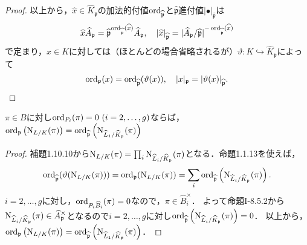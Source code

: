 \begin{proof}
  以上から，$\widehat{x}\in\widehat{K}_\mathfrak{p}$の加法的付値$\operatorname{ord}_{\widehat{\mathfrak{p}}}$と$\widehat{\mathfrak{p}}$進付値$\lvert\bullet\rvert _{\widehat{\mathfrak{p}}}$は
  \[\widehat{x}\widehat{A}_\mathfrak{p}=\widehat{\mathfrak{p}}^{\operatorname{ord}_{\widehat{\mathfrak{p}}}(\widehat{x})}\widehat{A}_\mathfrak{p},\quad\lvert\widehat{x}\rvert _{\widehat{\mathfrak{p}}}=\lvert\widehat{A}_\mathfrak{p}/\widehat{\mathfrak{p}}\rvert^{-\operatorname{ord}_{\widehat{\mathfrak{p}}}(\widehat{x})}\]
  で定まり，$x\in K$に対しては（ほとんどの場合省略されるが）$\vartheta\colon K\hookrightarrow\widehat{K}_\mathfrak{p}$によって
  \[\operatorname{ord}_\mathfrak{p}(x)=\operatorname{ord}_{\widehat{\mathfrak{p}}}(\vartheta(x)),\quad \lvert x\rvert _\mathfrak{p}=\lvert\vartheta(x)\rvert _{\widehat{\mathfrak{p}}}.\]
\end{proof}

\begin{screen}
    $\pi\in B$に対し$\ord_{P_i}(\pi)=0\ (i=2,\ldots,g)$ならば，$\operatorname{ord}_\mathfrak{p}\left(\operatorname{N}_{L/K}(\pi)\right)=\operatorname{ord}_{\widehat{\mathfrak{p}}}\left(\operatorname{N}_{\widehat{L}_1/\widehat{K}_\mathfrak{p}}(\pi)\right)$
\end{screen}
\begin{proof}
  補題1.10.10から$\operatorname{N}_{L/K}(\pi)=\prod_i\operatorname{N}_{\widehat{L}_i/\widehat{K}_\mathfrak{p}}(\pi)$となる．命題1.1.13を使えば，
  \[\operatorname{ord}_{\widehat{\mathfrak{p}}}(\vartheta(\operatorname{N}_{L/K}(\pi)))=\operatorname{ord}_\mathfrak{p}(\operatorname{N}_{L/K}(\pi))=\sum_i\operatorname{ord}_{\widehat{\mathfrak{p}}}\left(\operatorname{N}_{\widehat{L}_i/\widehat{K}_\mathfrak{p}}(\pi)\right).\]
  $i=2,\ldots,g$に対し，$\operatorname{ord}_{P_i\widehat{B}_i}(\pi)=0$なので，$\pi\in\widehat{B}_i^\times$．
  よって命題I-8.5.2から$\operatorname{N}_{\widehat{L}_i/\widehat{K}_\mathfrak{p}}(\pi)\in\widehat{A}_\mathfrak{p}^\times$となるので$i=2,\ldots,g$に対し$\operatorname{ord}_{\widehat{\mathfrak{p}}}\left(\operatorname{N}_{\widehat{L}_i/\widehat{K}_\mathfrak{p}}(\pi)\right)=0$．
  以上から，$\operatorname{ord}_\mathfrak{p}\left(\operatorname{N}_{L/K}(\pi)\right)=\operatorname{ord}_{\widehat{\mathfrak{p}}}\left(\operatorname{N}_{\widehat{L}_1/\widehat{K}_\mathfrak{p}}(\pi)\right)$．
\end{proof}

